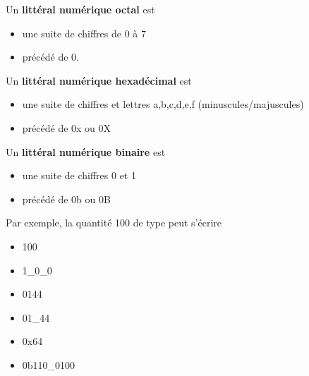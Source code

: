 \documentclass[11pt,a4paper]{article}
\begin{document}
            \par
        
          Un \textbf{litt\'eral num\'erique octal} est
            
					\begin{itemize}
				
			\item une suite de chiffres de 0 \`a 7
			\item pr\'ec\'ed\'e de 0.
					\end{itemize}
				
            \par
        
          Un \textbf{litt\'eral num\'erique hexad\'ecimal} est
            
					\begin{itemize}
				
			\item une suite de chiffres et lettres a,b,c,d,e,f (minuscules/majuscules)
			\item pr\'ec\'ed\'e de 0x ou 0X
					\end{itemize}
				
            \par
        
          Un \textbf{litt\'eral num\'erique binaire} est
            
					\begin{itemize}
				
			\item une suite de chiffres 0 et 1
			\item pr\'ec\'ed\'e de 0b ou 0B
					\end{itemize}
				
            \par
        
          Par exemple, la quantit\'e 100 de type \verb@int@ peut s'\'ecrire 
            
					\begin{itemize}
				
			\item 100
			\item 1\_0\_0
			\item 0144
			\item 01\_44
			\item 0x64
			\item 0b110\_0100
					\end{itemize}
				
            \par
        
\end{document}

